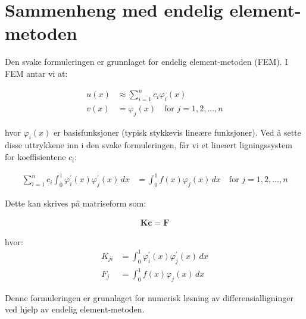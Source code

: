\section{Sammenheng med endelig element-metoden}

Den svake formuleringen er grunnlaget for endelig element-metoden (FEM). I FEM antar vi at:

\begin{align*}
  u(x) &\approx \sum_{i=1}^n c_i \varphi_i(x) \\
  v(x) &= \varphi_j(x) \quad \text{for } j=1,2,...,n
\end{align*}

hvor $\varphi_i(x)$ er basisfunksjoner (typisk stykkevis lineære funksjoner). Ved å sette disse uttrykkene inn i den svake formuleringen, får vi et lineært ligningssystem for koeffisientene $c_i$:

\begin{align*}
  \sum_{i=1}^n c_i \int_0^1 \varphi_i^{\prime}(x) \varphi_j^{\prime}(x) \, dx &= \int_0^1 f(x) \varphi_j(x) \, dx \quad \text{for } j=1,2,...,n
\end{align*}

Dette kan skrives på matriseform som:

\begin{align*}
  \mathbf{K} \mathbf{c} = \mathbf{F}
\end{align*}

hvor:
\begin{align*}
  K_{ji} &= \int_0^1 \varphi_i^{\prime}(x) \varphi_j^{\prime}(x) \, dx \\
  F_j &= \int_0^1 f(x) \varphi_j(x) \, dx
\end{align*}

Denne formuleringen er grunnlaget for numerisk løsning av differensialligninger ved hjelp av endelig element-metoden.

